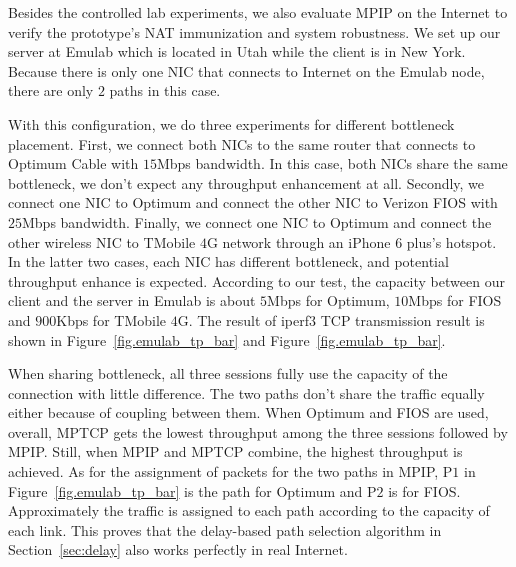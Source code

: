 %

Besides the controlled lab experiments, we also evaluate MPIP on the Internet to verify the prototype's NAT immunization and system robustness. We set up our server at Emulab\cite{emulab} which is located in Utah while the client is in New York. Because there is only one NIC that connects to Internet on the Emulab node, there are only $2$ paths in this case.

With this configuration, we do three experiments for different bottleneck placement. First, we connect both NICs to the same router that connects to Optimum Cable with $15$Mbps bandwidth. In this case, both NICs share the same bottleneck, we don't expect any throughput enhancement at all. Secondly, we connect one NIC to Optimum and connect the other NIC to Verizon FIOS with $25$Mbps bandwidth. Finally, we connect one NIC to Optimum and connect the other wireless NIC to TMobile $4$G network through an iPhone 6 plus's hotspot. In the latter two cases, each NIC has different bottleneck, and potential throughput enhance is expected. According to our test, the capacity between our client and the server in Emulab is about $5$Mbps for Optimum, $10$Mbps for FIOS and $900$Kbps for TMobile $4$G. The result of iperf3 TCP transmission result is shown in Figure~\ref{fig.emulab_tp_bar} and Figure~\ref{fig.emulab_tp_bar}.

When sharing bottleneck, all three sessions fully use the capacity of the connection with little difference. The two paths don't share the traffic equally either because of coupling between them. When Optimum and FIOS are used, overall, MPTCP gets the lowest throughput among the three sessions followed by MPIP. Still, when MPIP and MPTCP combine, the highest throughput is achieved. As for the assignment of packets for the two paths in MPIP, P$1$ in Figure~\ref{fig.emulab_tp_bar} is the path for Optimum and P$2$ is for FIOS. Approximately the traffic is assigned to each path according to the capacity of each link. This proves that the delay-based path selection algorithm in Section~\ref{sec:delay} also works perfectly in real Internet.

